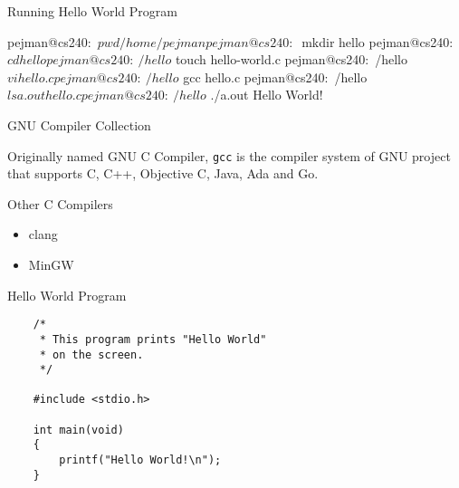 \documentclass[compress]{beamer}
\begin{document}
\begin{slide}
	\begin{block}{Running Hello World Program}

	\begin{terminal}
	pejman@cs240:~$ pwd
	/home/pejman
	pejman@cs240:~$ mkdir hello
	pejman@cs240:~$ cd hello
	pejman@cs240:~/hello$ touch hello-world.c
	pejman@cs240:~/hello$ vi hello.c
	pejman@cs240:~/hello$ gcc hello.c
	pejman@cs240:~/hello$ ls
	a.out   hello.c
	pejman@cs240:~/hello$ ./a.out
	Hello World!
	\end{terminal}

	\end{block}
\end{slide}

\begin{slide}
	\begin{block}{GNU Compiler Collection}

	Originally named GNU C Compiler, \alert{\texttt{gcc}} is the compiler system of GNU project that supports C, C++, Objective C, Java, Ada and Go.

	\end{block}
	\begin{block}{Other C Compilers}

	\begin{itemize}
	\item[] clang
	\item[] MinGW
	\end{itemize}

	\end{block}
\end{slide}

\begin{slide}
	\begin{block}{Hello World Program}

	\begin{verbatim}
	/*
	 * This program prints "Hello World"
	 * on the screen.
	 */

	#include <stdio.h>
	
	int main(void)
	{
	    printf("Hello World!\n");
	}
	\end{verbatim}

	\end{block}
\end{slide}
\end{document}
